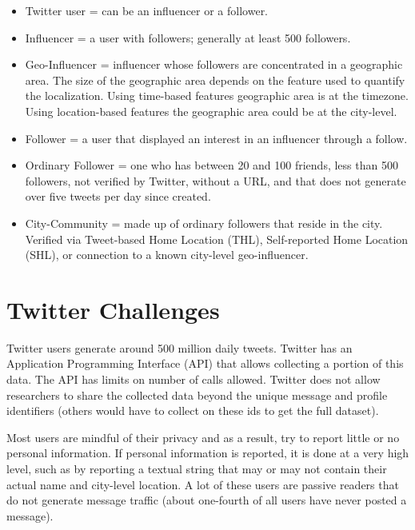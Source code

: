 \begin{itemize}
\setlength{\parskip}{0 in}
\item Twitter user = can be an influencer or a follower.
\item Influencer = a user with followers; generally at least 500 followers.
\item Geo-Influencer = influencer whose followers are concentrated in a geographic area. The size of the geographic area depends on the feature used to quantify the localization. Using time-based features geographic area is at the timezone. Using location-based features the geographic area could be at the city-level.
\item Follower = a user that displayed an interest in an influencer through a follow.
\item Ordinary Follower = one who has between 20 and 100 friends, less than 500 followers, not verified by Twitter, without a URL, and that does not generate over five tweets per day since created.
\item City-Community = made up of ordinary followers that reside in the city. Verified via Tweet-based Home Location (THL), Self-reported Home Location (SHL), or connection to a known city-level geo-influencer.
\end{itemize}

\section{Twitter Challenges}

Twitter users generate around 500 million daily tweets. Twitter has an Application Programming Interface (API) that allows collecting a portion of this data. The API has limits on number of calls allowed. Twitter does not allow researchers to share the collected data beyond the unique message and profile identifiers (others would have to collect on these ids to get the full dataset).

Most users are mindful of their privacy and as a result, try to report little or no personal information. If personal information is reported, it is done at a very high level, such as by reporting a textual string that may or may not contain their actual name and city-level location. A lot of these users are passive readers that do not generate message traffic (about one-fourth of all users have never posted a message).

